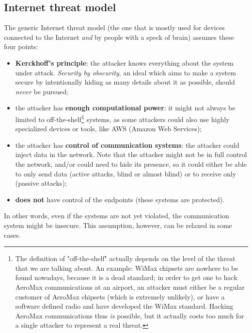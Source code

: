 
\subsection{Internet threat model}
\label{sec:internet_threat_model}
The generic Internet threat model (the one that is mostly used for devices connected to the Internet \textit{and} by people with a speck of brain) assumes these four points:

\begin{itemize}
    \item \textbf{Kerckhoff's principle}: the attacker knows everything about the system under attack. \textit{Security by obscurity}, an ideal which aims to make a system secure by intentionally hiding as many details about it as possible, should \textit{never} be pursued;
    \item the attacker has \textbf{enough computational power}: it might not always be limited to off-the-shelf\footnote{The definition of "off-the-shelf" actually depends on the level of the threat that we are talking about. An example: WiMax chipsets are nowhere to be found nowadays, because it is a dead standard; in order to get one to hack AeroMax communications at an airport, an attacker must either be a regular customer of AeroMax chipsets (which is extremely unlikely), or have a software defined radio and have developed the WiMax standard. Hacking AeroMax communications thus \textit{is} possible, but it actually costs too much for a single attacker to represent a real threat.} systems, as some attackers could also use highly specialized devices or tools, like AWS (Amazon Web Services);
    \item the attacker has \textbf{control of communication systems}: the attacker could inject data in the network. Note that the attacker might not be in full control the network, and/or could need to hide its presence, so it could either be able to only send data (active attacks, blind or almost blind) or to receive only (passive attacks);
    \item \textbf{does not} have control of the endpoints (these systems are protected).
\end{itemize}

In other words, even if the systems are not yet violated, the communication system might be
insecure. This assumption, however, can be relaxed in some cases.


